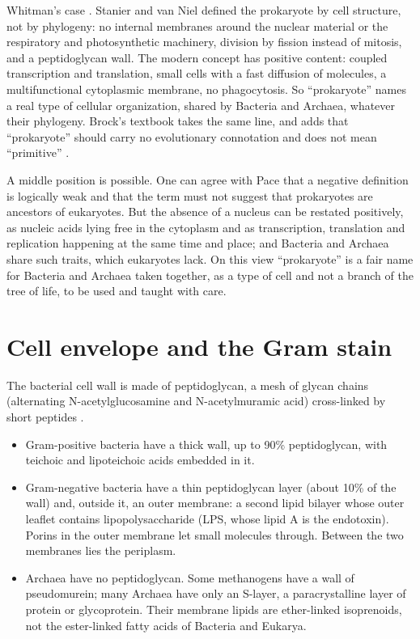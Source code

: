 Whitman's case \cite{whitman2009modern,
whitman2009rebuttal}. Stanier and van Niel
defined the prokaryote by cell structure, not
by phylogeny: no internal membranes around
the nuclear material or the respiratory and
photosynthetic machinery, division by fission
instead of mitosis, and a peptidoglycan wall.
The modern concept has positive content:
coupled transcription and translation, small
cells with a fast diffusion of molecules, a
multifunctional cytoplasmic membrane, no
phagocytosis. So ``prokaryote'' names a real
type of cellular organization, shared by
Bacteria and Archaea, whatever their
phylogeny. Brock's textbook takes the same
line, and adds that ``prokaryote'' should
carry no evolutionary connotation and does
not mean ``primitive'' \cite[Section
2.5]{madigan2012brock}.

\begin{remark}
\label{remark-daniel-position}
A middle
position is possible. One can agree with Pace that a negative
definition is logically weak and that the
term must not suggest that prokaryotes are
ancestors of eukaryotes. But the absence of a
nucleus can be restated positively, as
nucleic acids lying free in the cytoplasm and
as transcription, translation and replication
happening at the same time and place; and
Bacteria and Archaea share such traits, which
eukaryotes lack. On this view
``prokaryote'' is a fair name for Bacteria
and Archaea taken together, as a type of cell
and not a branch of the tree of life, to be
used and taught with care.
\end{remark}

\section{Cell envelope and the Gram stain}
\label{section-gram-stain}

The bacterial cell wall is made of
peptidoglycan, a mesh of glycan chains
(alternating N-acetylglucosamine and
N-acetylmuramic acid) cross-linked by short
peptides \cite[Sections
3.6--3.8]{madigan2012brock}.
\begin{itemize}
\item Gram-positive bacteria have a thick
wall, up to 90\% peptidoglycan, with teichoic
and lipoteichoic acids embedded in it.
\item Gram-negative bacteria have a thin
peptidoglycan layer (about 10\% of the wall)
and, outside it, an outer membrane: a second
lipid bilayer whose outer leaflet contains
lipopolysaccharide (LPS, whose lipid A is the
endotoxin). Porins in the outer membrane let
small molecules through. Between the two
membranes lies the periplasm.
\item Archaea have no peptidoglycan. Some
methanogens have a wall of pseudomurein; many
Archaea have only an S-layer, a
paracrystalline layer of protein or
glycoprotein. Their membrane lipids are
ether-linked isoprenoids, not the
ester-linked fatty acids of Bacteria and
Eukarya.
\end{itemize}

